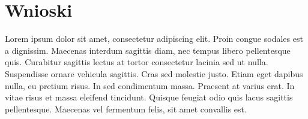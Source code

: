 \documentclass{article}
\begin{document}
\section{Wnioski}
Lorem ipsum dolor sit amet, consectetur adipiscing elit. Proin congue sodales est a
dignissim. Maecenas interdum sagittis diam, nec tempus libero pellentesque quis. Curabitur
sagittis lectus at tortor consectetur lacinia sed ut nulla. Suspendisse ornare vehicula sagittis.
Cras sed molestie justo. Etiam eget dapibus nulla, eu pretium risus. In sed condimentum
massa. Praesent at varius erat. In vitae risus et massa eleifend tincidunt. Quisque feugiat
odio quis lacus sagittis pellentesque. Maecenas vel fermentum felis, sit amet convallis est.
\end{document}
